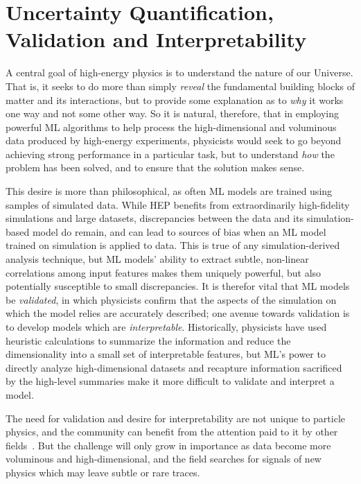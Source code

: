 \documentclass[submission,Phys]{SciPost}
\begin{document}
\section{Uncertainty Quantification, Validation and Interpretability}
\label{sec:interp}

A central goal of high-energy physics is to understand the nature of our Universe. That is, it seeks to do more than simply {\it reveal} the fundamental building blocks of matter and its interactions, but to provide some explanation as to {\it why} it works one way and not some other way. So it is natural, therefore, that in employing powerful ML algorithms to help process the high-dimensional and voluminous data produced by high-energy experiments, physicists would seek to go beyond achieving strong performance in a particular task, but to understand {\it how} the problem has been solved, and to ensure that the solution makes sense.

This desire is more than philosophical, as often ML models are trained using samples of simulated data. While HEP benefits from extraordinarily high-fidelity simulations and large datasets, discrepancies between the data and its simulation-based model do remain, and can lead to sources of bias when an ML model trained on simulation is applied to data.  This is true of any simulation-derived analysis technique, but ML models' ability to extract subtle, non-linear correlations among input features makes them uniquely powerful, but also potentially susceptible to small discrepancies. 
%
It is therefor vital that ML models be {\it validated}, in which physicists  confirm that the aspects of the simulation on which the model relies are accurately described; one avenue towards validation is to develop models which are {\it interpretable}. Historically, physicists have used heuristic calculations to summarize the information and reduce the dimensionality into a small set of interpretable features, but ML's power to directly analyze high-dimensional datasets and recapture information sacrificed by the high-level summaries make it more difficult to validate and interpret a model.

The need for validation and desire for interpretability are not unique to particle physics, and the community can benefit from the attention paid to it by other fields~\cite{csinterp}.  But the challenge will only grow in importance as  data become more voluminous and high-dimensional, and the field searches for signals of new physics which may leave subtle or rare traces.
\end{document}
